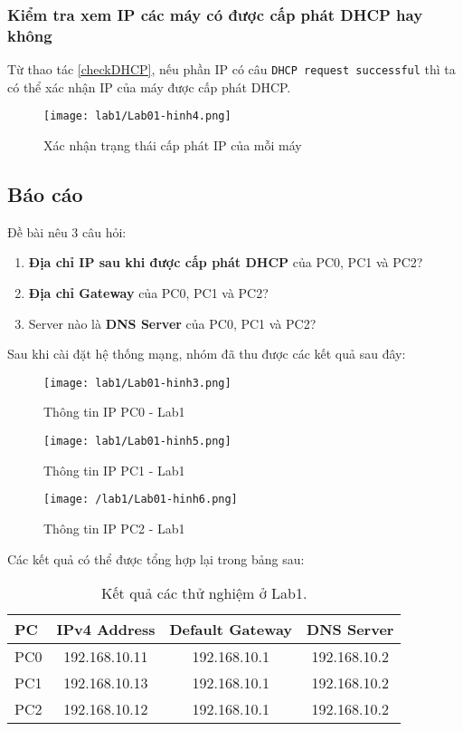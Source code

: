 \documentclass[]{article}
\begin{document}
\subsubsection{Kiểm tra xem IP các máy có được cấp phát DHCP hay không}
Từ thao tác \ref{checkDHCP}, nếu phần IP có câu \texttt{DHCP request successful} thì ta có thể xác nhận IP của máy được cấp phát DHCP.
\begin{figure}[H]
    \centering
    \texttt{[image: lab1/Lab01-hinh4.png]}
    \caption{Xác nhận trạng thái cấp phát IP của mỗi máy}
\end{figure}

\subsection{Báo cáo}
Đề bài nêu 3 câu hỏi:
\begin{enumerate}
    \item \textbf{Địa chỉ IP sau khi được cấp phát DHCP} của PC0, PC1 và PC2?
    \item \textbf{Địa chỉ Gateway} của PC0, PC1 và PC2?
    \item Server nào là \textbf{DNS Server} của PC0, PC1 và PC2?
\end{enumerate}
Sau khi cài đặt hệ thống mạng, nhóm đã thu được các kết quả sau đây:
\begin{figure}[H]
    \centering
    \texttt{[image: lab1/Lab01-hinh3.png]}
    \caption{Thông tin IP PC0 - Lab1}
\end{figure}
\begin{figure}[H]
    \centering
    \texttt{[image: lab1/Lab01-hinh5.png]}
    \caption{Thông tin IP PC1 - Lab1}
\end{figure}
\begin{figure}[H]
    \centering
    \texttt{[image: /lab1/Lab01-hinh6.png]}
    \caption{Thông tin IP PC2 - Lab1}
\end{figure}
Các kết quả có thể được tổng hợp lại trong bảng sau:
\begin{table}[H]
    \centering
    \caption{Kết quả các thử nghiệm ở Lab1.}
    \begin{tabular}[t]{lccc}
        \toprule
        PC&IPv4 Address&Default Gateway&DNS Server\\
        \midrule
        PC0&192.168.10.11&192.168.10.1&192.168.10.2\\
        PC1&192.168.10.13&192.168.10.1&192.168.10.2\\
        PC2&192.168.10.12&192.168.10.1&192.168.10.2\\
        \bottomrule
    \end{tabular}
\end{table}
\end{document}
